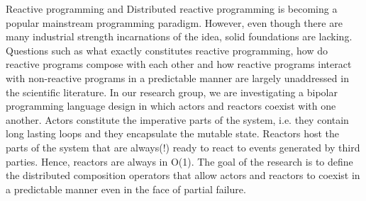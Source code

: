 Reactive programming and Distributed reactive programming is becoming a popular mainstream programming paradigm. However, even though there are many industrial strength incarnations of the idea, solid foundations are lacking. Questions such as what exactly constitutes reactive programming, how do reactive programs compose with each other and  how reactive programs interact with non-reactive programs in a predictable manner are largely unaddressed in the scientific literature.
In our research group, we are investigating a bipolar programming language design in which actors and reactors coexist with one another. Actors constitute the imperative parts of the system, i.e. they contain long lasting loops and they encapsulate the mutable state. Reactors host the parts of the system that are always(!) ready to react to events generated by third parties. Hence, reactors are always in O(1). The goal of the research is to define the distributed composition operators that allow actors and reactors to coexist in a predictable manner even in the face of partial failure.
